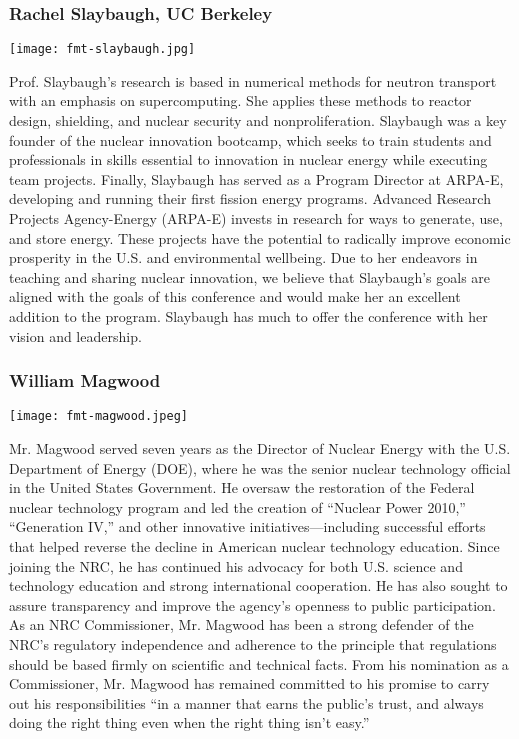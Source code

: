 \subsubsection{Rachel Slaybaugh, UC Berkeley}
\begin{minipage}{0.25\textwidth}
	\centering
	\texttt{[image: fmt-slaybaugh.jpg]}
\end{minipage}
\begin{minipage}{0.73\textwidth}
	Prof. Slaybaugh's research is based in numerical methods for neutron transport with an emphasis on supercomputing. She applies these methods to reactor design, shielding, and nuclear security and nonproliferation. Slaybaugh was a key founder of the nuclear innovation bootcamp, which seeks to train students and professionals in skills essential to innovation in nuclear energy while executing team projects. Finally, Slaybaugh has served as a Program Director at ARPA-E, developing and running their first fission energy programs. Advanced Research Projects Agency-Energy (ARPA-E) invests in research for ways to generate, use, and store energy. These projects have the potential to radically improve economic prosperity in the U.S. and environmental wellbeing. Due to her endeavors in teaching and sharing nuclear innovation, we believe that Slaybaugh's goals are aligned with the goals of this conference and would make her an excellent addition to the program. Slaybaugh has much to offer the conference with her vision and leadership.
\end{minipage}

\subsubsection{William Magwood}
\begin{minipage}{0.25\textwidth}
	\centering
	\texttt{[image: fmt-magwood.jpeg]}
\end{minipage}
\begin{minipage}{0.73\textwidth}
	Mr. Magwood served seven years as the Director of Nuclear Energy with the U.S. Department of Energy (DOE), where he was the senior nuclear technology official in the United States Government. He oversaw the restoration of the Federal nuclear technology program and led the creation of ``Nuclear Power 2010,'' ``Generation IV,'' and other innovative initiatives—including successful efforts that helped reverse the decline in American nuclear technology education. Since joining the NRC, he has continued his advocacy for both U.S. science and technology education and strong international cooperation. He has also sought to assure transparency and improve the agency's openness to public participation. As an NRC Commissioner, Mr. Magwood has been a strong defender of the NRC's regulatory independence and adherence to the principle that regulations should be based firmly on scientific and technical facts. From his nomination as a Commissioner, Mr. Magwood has remained committed to his promise to carry out his responsibilities ``in a manner that earns the public's trust, and always doing the right thing even when the right thing isn't easy.''
\end{minipage}

